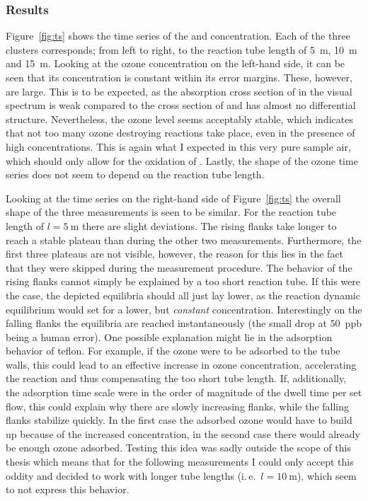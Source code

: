 \subsubsection{Results}
\label{sec:no-results}

Figure~\ref{fig:ts} shows the time series of the  and 
concentration. Each of the three clusters corresponds; from left to
right, to the reaction tube length of \SI{5}{\meter}, \SI{10}{\meter}
and \SI{15}{\meter}. Looking at the ozone concentration on the
left-hand side, it can be seen that its concentration is constant
within its error margins. These, however, are large. This is to be
expected, as the absorption cross section of  in the visual
spectrum is weak compared to the cross section of  and has
almost no differential structure. Nevertheless, the ozone level seems
acceptably stable, which indicates that not too many ozone destroying
reactions take place, even in the presence of high 
concentrations. This is again what I expected in this very pure sample
air, which should only allow for the oxidation of . Lastly, the
shape of the ozone time series does not seem to depend on the reaction
tube length.

Looking at the  time series on the right-hand side of
Figure~\ref{fig:ts} the overall shape of the three measurements is
seen to be similar. For the reaction tube length of
$l= \SI{5}{\meter}$ there are slight deviations. The rising flanks
take longer to reach a stable plateau than during the other two
measurements. Furthermore, the first three plateaus are not visible,
however, the reason for this lies in the fact that they were skipped
during the measurement procedure. The behavior of the rising flanks
cannot simply be explained by a too short reaction tube. If this were
the case, the depicted equilibria should all just lay lower, as the
reaction dynamic equilibrium would set for a lower, but
\emph{constant}  concentration. Interestingly on the falling
flanks the equilibria are reached instantaneously (the small drop at
\SI{50}{ppb} being a human error). One possible explanation might lie
in the adsorption behavior of teflon. For example, if the ozone were
to be adsorbed to the tube walls, this could lead to an effective
increase in ozone concentration, accelerating the reaction and thus
compensating the too short tube length. If, additionally, the
adsorption time scale were in the order of magnitude of the dwell time
per set flow, this could explain why there are slowly increasing
flanks, while the falling flanks stabilize quickly. In the first case
the adsorbed ozone would have to build up because of the increased
concentration, in the second case there would already be enough ozone
adsorbed. Testing this idea was sadly outside the scope of this thesis
which means that for the following measurements I could only accept
this oddity and decided to work with longer tube lengths
(i.\,e.~$l = \SI{10}{\meter}$), which seem to not express this
behavior.


